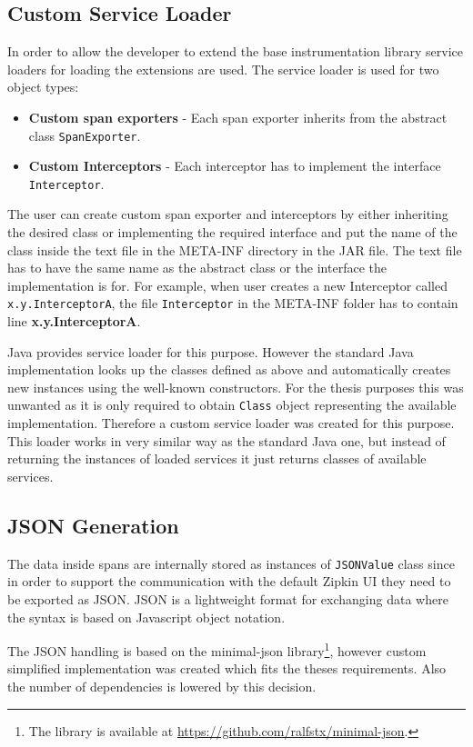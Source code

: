 \subsection{Custom Service Loader}
In order to allow the developer to extend the base instrumentation library service loaders for loading the extensions are used. The service loader is used for two object types: 
\begin{itemize}
	\item \textbf{Custom span exporters} - Each span exporter inherits from the abstract class \texttt{SpanExporter}.
	\item \textbf{Custom Interceptors} - Each interceptor has to implement the interface \texttt{Interceptor}.
\end{itemize} 
The user can create custom span exporter and interceptors by either inheriting the desired class or implementing the required interface and put the name of the class inside the text file in the META-INF directory in the JAR file. The text file has to have the same name as the abstract class or the interface the implementation is for. For example, when user creates a new Interceptor called \texttt{x.y.InterceptorA}, the file \texttt{Interceptor} in the META-INF folder has to contain line \textbf{x.y.InterceptorA}.

Java provides service loader for this purpose. However the standard Java implementation looks up the classes defined as above and automatically creates new instances using the well-known constructors. For the thesis purposes this was unwanted as it is only required to obtain \texttt{Class} object representing the available implementation. Therefore a custom service loader was created for this purpose. This loader works in very similar way as the standard Java one, but instead of returning the instances of loaded services it just returns classes of available services. 

\subsection{JSON Generation}
\label{json_gen}
The data inside spans are internally stored as instances of \texttt{JSONValue} class since in order to support the communication with the default Zipkin UI they need to be exported as JSON. JSON is a lightweight format for exchanging data where the syntax is based on Javascript object notation.

The JSON handling is based on the minimal-json library\footnote{The library is available at \url{https://github.com/ralfstx/minimal-json}.}, however custom simplified implementation was created which fits the theses requirements. Also the number of dependencies is lowered by this decision. 


